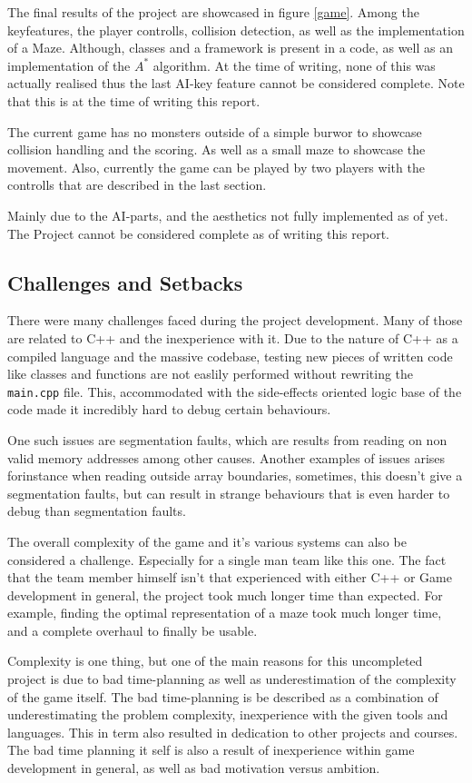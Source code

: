\documentclass{article}
\begin{document}
  The final results of the project are showcased in figure \ref{game}. Among the keyfeatures, the player controlls, collision detection, as well as the implementation of a Maze. Although, classes and a framework is present in a code, as well as an implementation of the $A^*$ algorithm. At the time of writing, none of this was actually realised thus the last AI-key feature cannot be considered complete. Note that this is at the time of writing this report.

  The current game has no monsters outside of a simple burwor to showcase collision handling and the scoring. As well as a small maze to showcase the movement. Also, currently the game can be played by two players with the controlls that are described in the last section.

  Mainly due to the AI-parts, and the aesthetics not fully implemented as of yet. The Project cannot be considered complete as of writing this report.

  \subsection{Challenges and Setbacks}
  There were many challenges faced during the project development. Many of those are related to C++ and the inexperience with it. Due to the nature of C++ as a compiled language and the massive codebase, testing new pieces of written code like classes and functions are not easlily performed without rewriting the \texttt{main.cpp} file. This, accommodated with the side-effects oriented logic base of the code made it incredibly hard to debug certain behaviours.

  One such issues are segmentation faults, which are results from reading on non valid memory addresses among other causes. Another examples of issues arises forinstance when reading outside array boundaries, sometimes, this doesn't give a segmentation faults, but can result in strange behaviours that is even harder to debug than segmentation faults.

  The overall complexity of the game and it's various systems can also be considered a challenge. Especially for a single man team like this one. The fact that the team member himself isn't that experienced with either C++ or Game development in general, the project took much longer time than expected. For example, finding the optimal representation of a maze took much longer time, and a complete overhaul to finally be usable.

  Complexity is one thing, but one of the main reasons for this uncompleted project is due to bad time-planning as well as underestimation of the complexity of the game itself. The bad time-planning is be described as a combination of underestimating the problem complexity, inexperience with the given tools and languages. This in term also resulted in dedication to other projects and courses. The bad time planning it self is also a result of inexperience within game development in general, as well as bad motivation versus ambition.
\end{document}
